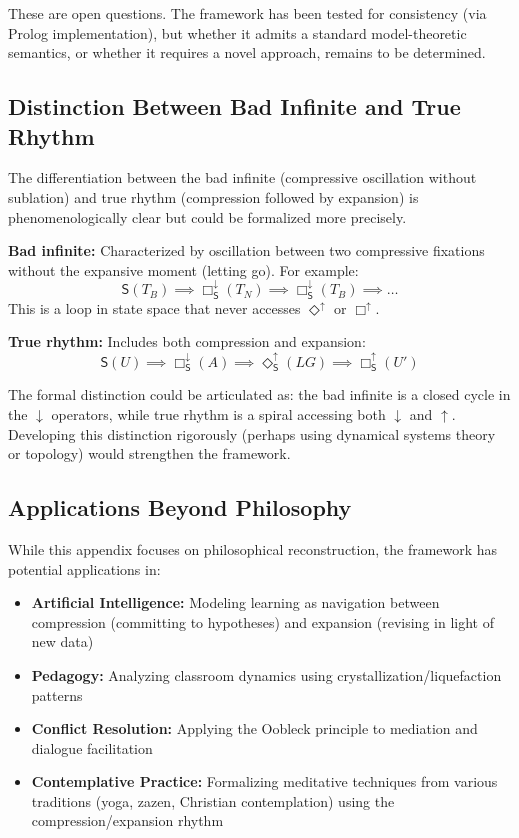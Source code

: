 \documentclass[12pt]{book}
\begin{document}
These are open questions. The framework has been tested for consistency (via Prolog implementation), but whether it admits a standard model-theoretic semantics, or whether it requires a novel approach, remains to be determined.

\subsection{Distinction Between Bad Infinite and True Rhythm}

The differentiation between the bad infinite (compressive oscillation without sublation) and true rhythm (compression followed by expansion) is phenomenologically clear but could be formalized more precisely.

\textbf{Bad infinite:} Characterized by oscillation between two compressive fixations without the expansive moment (letting go). For example:
\[
\mathsf{S}(T_B) \implies \Box_{\mathsf{S}}^{\downarrow}(T_N) \implies \Box_{\mathsf{S}}^{\downarrow}(T_B) \implies \ldots
\]
This is a loop in state space that never accesses $\Diamond^{\uparrow}$ or $\Box^{\uparrow}$.

\textbf{True rhythm:} Includes both compression and expansion:
\[
\mathsf{S}(U) \implies \Box_{\mathsf{S}}^{\downarrow}(A) \implies \Diamond_{\mathsf{S}}^{\uparrow}(LG) \implies \Box_{\mathsf{S}}^{\uparrow}(U')
\]

The formal distinction could be articulated as: the bad infinite is a closed cycle in the $\downarrow$ operators, while true rhythm is a spiral accessing both $\downarrow$ and $\uparrow$. Developing this distinction rigorously (perhaps using dynamical systems theory or topology) would strengthen the framework.

\subsection{Applications Beyond Philosophy}

While this appendix focuses on philosophical reconstruction, the framework has potential applications in:

\begin{itemize}
\item \textbf{Artificial Intelligence:} Modeling learning as navigation between compression (committing to hypotheses) and expansion (revising in light of new data)
\item \textbf{Pedagogy:} Analyzing classroom dynamics using crystallization/liquefaction patterns
\item \textbf{Conflict Resolution:} Applying the Oobleck principle to mediation and dialogue facilitation
\item \textbf{Contemplative Practice:} Formalizing meditative techniques from various traditions (yoga, zazen, Christian contemplation) using the compression/expansion rhythm
\end{itemize}
\end{document}
